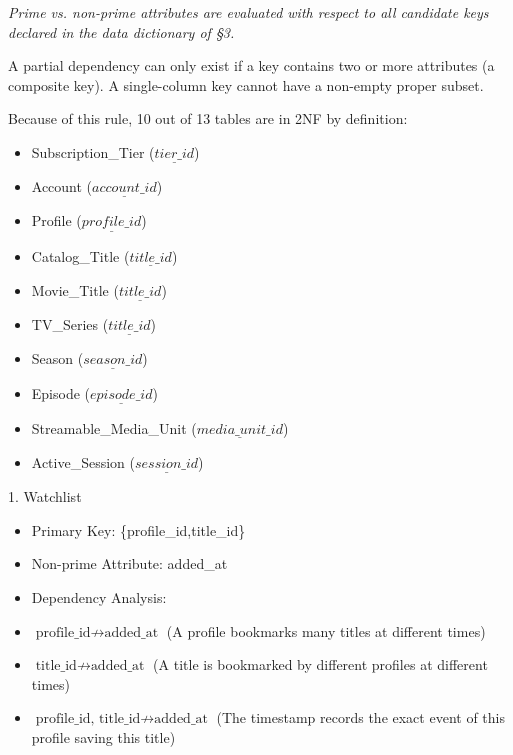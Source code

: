 \emph{Prime vs. non-prime attributes are evaluated with respect to all candidate keys declared in the data dictionary of §3.}

A partial dependency can only exist if a key contains two or more attributes (a composite key). A single-column key cannot have a non-empty proper subset.

Because of this rule, 10 out of 13 tables are in 2NF by definition:

\begin{itemize}
\item
  Subscription\_\allowbreak{}Tier (\(\underline{tier\_\allowbreak{} id}\))
\item
  Account (\(\underline{account\_\allowbreak{} id}\))
\item
  Profile (\(\underline{profile\_\allowbreak{} id}\))
\item
  Catalog\_\allowbreak{}Title (\(\underline{title\_\allowbreak{} id}\))
\item
  Movie\_\allowbreak{}Title (\(\underline{title\_\allowbreak{} id}\))
\item
  TV\_\allowbreak{}Series (\(\underline{title\_\allowbreak{} id}\))
\item
  Season (\(\underline{season\_\allowbreak{} id}\))
\item
  Episode (\(\underline{episode\_\allowbreak{} id}\))
\item
  Streamable\_\allowbreak{}Media\_\allowbreak{}Unit (\(\underline{media\_\allowbreak{} unit\_\allowbreak{} id}\))
\item
  Active\_\allowbreak{}Session (\(\underline{session\_\allowbreak{} id}\))
\end{itemize}

1. Watchlist

\begin{itemize}
\item
  Primary Key: \{profile\_\allowbreak{}id,title\_\allowbreak{}id\}
\item
  Non-prime Attribute: added\_\allowbreak{}at
\item
  Dependency Analysis:
\end{itemize}

\begin{itemize}
\item
  \({\text{profile\_id}} \not\to \text{added\_at}\) (A profile bookmarks many titles at different times)
\item
  \({\text{title\_id}} \not\to \text{added\_at}\) (A title is bookmarked by different profiles at different times)
\item
    \({\text{profile\_id, title\_id}} \not\to \text{added\_at}\) (The timestamp records the exact event of this profile saving this title)
\end{itemize}

